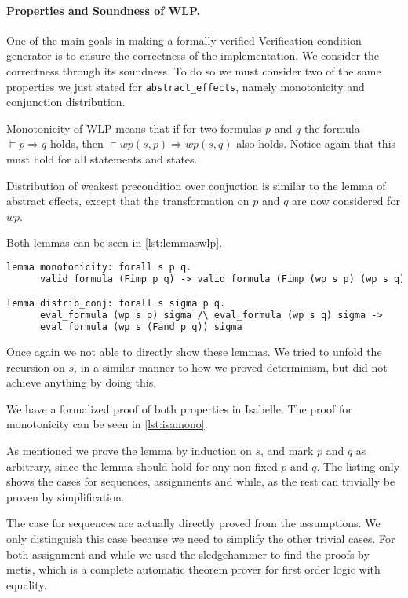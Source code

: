 \paragraph{Properties and Soundness of WLP.}
One of the main goals in making a formally verified Verification condition generator is to ensure the correctness of the implementation.
We consider the correctness through its soundness.
To do so we must consider two of the same properties we just stated for \texttt{abstract\_effects}, namely monotonicity and conjunction distribution.

Monotonicity of WLP means that if for two formulas $p$ and $q$ the formula $\vDash p \Rightarrow q$ holds, then $\vDash wp(s, p) \Rightarrow wp(s,q)$ also holds.
Notice again that this must hold for all statements and states.

Distribution of weakest precondition over conjuction is similar to the lemma of abstract effects, except that the transformation on $p$ and $q$ are now considered for $wp$.

Both lemmas can be seen in \autoref{lst:lemmaswlp}.

\begin{lstlisting}[caption={Lemmas for stating monotonicity and distribution over conjunction for wlp},label={lst:lemmaswlp},language=sml]
lemma monotonicity: forall s p q.
      valid_formula (Fimp p q) -> valid_formula (Fimp (wp s p) (wp s q))

lemma distrib_conj: forall s sigma p q.
      eval_formula (wp s p) sigma /\ eval_formula (wp s q) sigma ->
      eval_formula (wp s (Fand p q)) sigma
\end{lstlisting}

Once again we not able to directly show these lemmas.
We tried to unfold the recursion on $s$, in a similar manner to how we proved determinism, but
 did not achieve anything by doing this.

We have a formalized proof of both properties in Isabelle.
The proof for monotonicity can be seen in \autoref{lst:isamono}.

As mentioned we prove the lemma by induction on $s$,
and mark $p$ and $q$ as arbitrary, since the lemma should hold for any non-fixed $p$ and $q$.
The listing only shows the cases for sequences, assignments and while, as the rest can trivially be proven by simplification.

The case for sequences are actually directly proved from the assumptions.
We only distinguish this case because we need to simplify the other trivial cases.
For both assignment and while we used the sledgehammer to find the proofs by metis,
which is a complete automatic theorem prover for first order logic with equality\cite{sledgehammer}.

